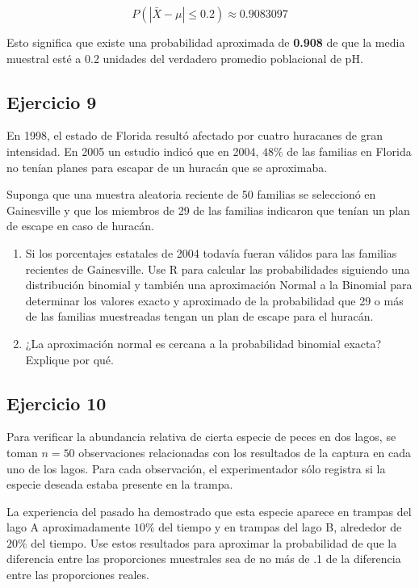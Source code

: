\documentclass[
]{article}
\begin{document}
\[
P(|\bar{X} - \mu| \leq 0.2) \approx 0.9083097
\]

Esto significa que existe una probabilidad aproximada de \textbf{0.908} de que la media muestral esté a 0.2 unidades del verdadero promedio poblacional de pH.

\subsection{Ejercicio 9}\label{ejercicio-9}

En 1998, el estado de Florida resultó afectado por cuatro huracanes de gran intensidad. En 2005 un estudio indicó que en 2004, \(48 \%\) de las familias en Florida no tenían planes para escapar de un huracán que se aproximaba.

Suponga que una muestra aleatoria reciente de 50 familias se seleccionó en Gainesville y que los miembros de 29 de las familias indicaron que tenían un plan de escape en caso de huracán.

\begin{enumerate}
\def\labelenumi{\alph{enumi}.}
\item
  Si los porcentajes estatales de 2004 todavía fueran válidos para las familias recientes de Gainesville. Use R para calcular las probabilidades siguiendo una distribución binomial y también una aproximación Normal a la Binomial para determinar los valores exacto y aproximado de la probabilidad que 29 o más de las familias muestreadas tengan un plan de escape para el huracán.
\item
  ¿La aproximación normal es cercana a la probabilidad binomial exacta? Explique por qué.
\end{enumerate}

\subsection{Ejercicio 10}\label{ejercicio-10}

Para verificar la abundancia relativa de cierta especie de peces en dos lagos, se toman \(n=50\) observaciones relacionadas con los resultados de la captura en cada uno de los lagos. Para cada observación, el experimentador sólo registra si la especie deseada estaba presente en la trampa.

La experiencia del pasado ha demostrado que esta especie aparece en trampas del lago A aproximadamente \(10 \%\) del tiempo y en trampas del lago B, alrededor de \(20 \%\) del tiempo. Use estos resultados para aproximar la probabilidad de que la diferencia entre las proporciones muestrales sea de no más de .1 de la diferencia entre las proporciones reales.
\end{document}
